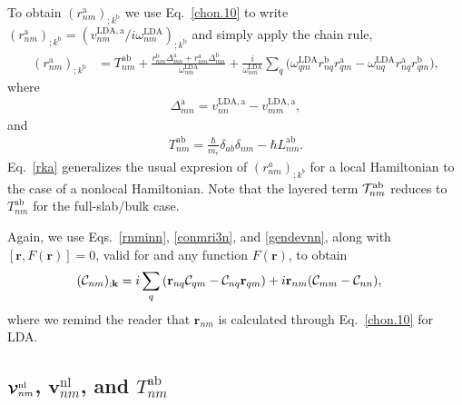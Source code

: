 \documentclass[floatfix,prb,aps,superscriptaddress,showpacs,11pt,preprint,letterpaper]{revtex4}
\begin{document}
To obtain $(r^{\mathrm{a}}_{nm})_{;k^{\mathrm{b}}}$ we use Eq.~\eqref{chon.10} to
write
$(r^{\mathrm{a}}_{nm})_{;k^{\mathrm{b}}}
=(v^{\mathrm{LDA},\mathrm{a}}_{nm}/i\omega^\mathrm{LDA}_{nm})_{;k^{\mathrm{b}}}
$ and simply apply the chain rule,
\begin{align}\label{rka}
(r^{\mathrm{a}}_{nm})_{;k^{\mathrm{b}}}
&=
T^{\mathrm{a}\mathrm{b}}_{nm}
+
\frac{ 
r^{\mathrm{b}}_{nm}
\Delta^{\mathrm{a}}_{mn}
+r^{\mathrm{a}}_{nm}
\Delta^{\mathrm{b}}_{mn}
}
{\omega^\mathrm{LDA}_{nm}}
+
\frac{i}{\omega^\mathrm{LDA}_{nm}}
\sum_{q}
\bigg(
\omega^\mathrm{LDA}_{q m} 
r^{\mathrm{b}}_{nq} 
r^{\mathrm{a}}_{q m}
-
\omega^\mathrm{LDA}_{nq} 
r^{\mathrm{a}}_{nq} 
r^{\mathrm{b}}_{q m}
\bigg)
,
\end{align} 
where 
\begin{eqnarray}\label{del}
\Delta^{\mathrm{a}}_{mn}
=
v^{\mathrm{LDA},\mathrm{a}}_{nn}  
-
v^{\mathrm{LDA},\mathrm{a}}_{mm}  
,
\end{eqnarray}
and
\begin{align}\label{tau.1n} 
T_{nm}^{\mathrm{a}\mathrm{b}}
=\frac{\hbar}{m_e}\delta_{ab}\delta_{nm} 
-\hbar L^{\mathrm{a}\mathrm{b}}_{nm} 
.
\end{align}
Eq.~\eqref{rka} generalizes the usual expresion of
$(r^a_{nm})_{;k^b}$ for a local 
Hamiltonian
\cite{aversaPRB95,nastosPRB05,cabellosPRB09,rashkeevPRB98}
to
the case of a
nonlocal Hamiltonian.
Note that the layered term
${\cal T}^{\mathrm{a}\mathrm{b}}_{nm}$ reduces to $T^{\mathrm{a}\mathrm{b}}_{nm}$
for the full-slab/bulk case.

Again, we use Eqs.~\eqref{rnminn}, \eqref{conmri3n}, and \eqref{gendevnn},
along with $[\mathbf{r},F(\mathbf{r})]=0$, valid for 
and any function $F(\mathbf{r})$, 
to obtain 
\begin{align} 
({\mathbf{\cal C}}_{nm})_{;\mathbf{k}}
&=
i 
\sum_{q} 
 \left(\mathbf{r}_{nq}
{\mathbf{\cal C}}_{qm}
-
{\mathbf{\cal C}}_{nq}
\mathbf{r}_{qm}
\right) 
+i\mathbf{r}_{nm}({\mathbf{\cal C}}_{mm}-{\mathbf{\cal C}}_{nn}) 
,
\end{align} 
where we remind the reader that $\mathbf{r}_{nm}$ 
is calculated through 
Eq.~\eqref{chon.10} for LDA. 


\subsection{
\texorpdfstring{$\boldsymbol{\mathcal{\cal V}}^{\mathrm{nl}}_{nm}$}{Vnonlocal},
\texorpdfstring{$\mathbf{v}^\mathrm{nl}_{nm}$}{Vnonlocal}, and 
\texorpdfstring{$T^{\mathrm{a}\mathrm{b}}_{nm}$}{[r,vnl]}}
\label{vesnl}
\end{document}
